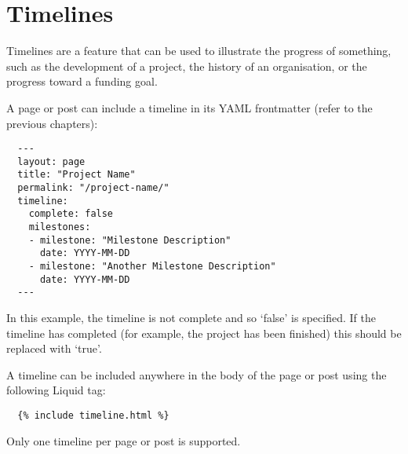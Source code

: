 \chapter{Timelines}

Timelines are a feature that can be used to illustrate the progress of something, such as the development of a project, the history of an organisation, or the progress toward a funding goal.

A page or post can include a timeline in its YAML frontmatter (refer to the previous chapters):

\begin{verbatim}
  ---
  layout: page
  title: "Project Name"
  permalink: "/project-name/"
  timeline:
    complete: false
    milestones:
    - milestone: "Milestone Description"
      date: YYYY-MM-DD
    - milestone: "Another Milestone Description"
      date: YYYY-MM-DD
  ---
\end{verbatim}

In this example, the timeline is not complete and so `false' is specified. If the timeline has completed (for example, the project has been finished) this should be replaced with `true'.

A timeline can be included anywhere in the body of the page or post using the following Liquid tag:

\begin{verbatim}
  {% include timeline.html %}
\end{verbatim}

Only one timeline per page or post is supported.
